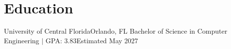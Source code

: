 \section{Education}
  \resumeSubHeadingListStart
    \resumeSubheading
      {University of Central Florida}{Orlando, FL}
      {Bachelor of Science in Computer Engineering $|$ GPA: 3.83}{Estimated May 2027}
  \resumeSubHeadingListEnd
  \vspace{-7pt}
